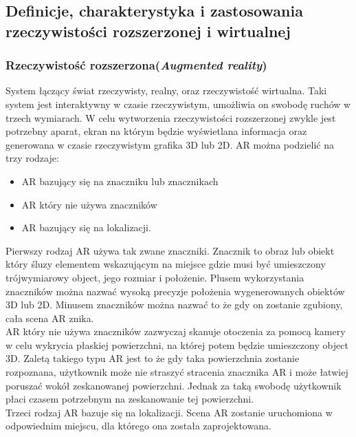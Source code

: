 \subsection{Definicje, charakterystyka i zastosowania rzeczywistości rozszerzonej i wirtualnej}

\subsubsection{Rzeczywistość rozszerzona(\textit{Augmented reality})}

System łączący świat rzeczywisty, realny,  oraz rzeczywistość wirtualna. Taki system jest interaktywny w czasie rzeczywistym, umożliwia on  swobodę ruchów w trzech wymiarach. W celu wytworzenia rzeczywistości rozszerzonej zwykle  jest potrzebny aparat, ekran na którym będzie wyświetlana informacja oraz generowana w czasie  rzeczywistym grafika 3D lub 2D. AR można podzielić na trzy rodzaje:  

\begin{itemize}
	\item AR bazujący się na znaczniku lub znacznikach 
	\item AR który nie używa znaczników 
	\item AR bazujący się na lokalizacji. \\
\end{itemize}

Pierwszy rodzaj AR używa tak zwane znaczniki. Znacznik to obraz lub obiekt który śluzy  elementem wskazującym na miejsce gdzie musi być umieszczony trójwymiarowy object, jego  rozmiar i położenie. Plusem wykorzystania znaczników można nazwać wysoką precyzje położenia  wygenerowanych obiektów 3D lub 2D. Minusem znaczników można nazwać to że gdy on  zostanie zgubiony, cała scena AR znika. \\

AR który nie używa znaczników zazwyczaj skanuje otoczenia za pomocą kamery w celu wykrycia  płaskiej powierzchni, na której potem będzie umieszczony object 3D. Zaletą takiego typu AR jest  to że gdy taka powierzchnia zostanie rozpoznana, użytkownik może nie straszyć stracenia  znacznika AR i może łatwiej poruszać wokół zeskanowanej powierzchni. Jednak za taką swobodę  użytkownik płaci czasem potrzebnym na zeskanowanie tej powierzchni. \\
 
Trzeci rodzaj AR bazuje się na lokalizacji. Scena AR zostanie uruchomiona w odpowiednim  miejscu, dla którego ona została zaprojektowana. \\

